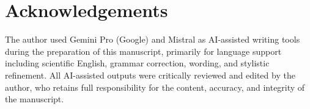 \documentclass{acmsiggraph}
\begin{document}
\section*{Acknowledgements}

The author used Gemini Pro (Google) and Mistral as AI-assisted writing
tools during the preparation of this manuscript, primarily for language
support including scientific English, grammar correction, wording, and
stylistic refinement. All AI-assisted outputs were critically reviewed
and edited by the author, who retains full responsibility for the
content, accuracy, and integrity of the manuscript.



\end{document}
